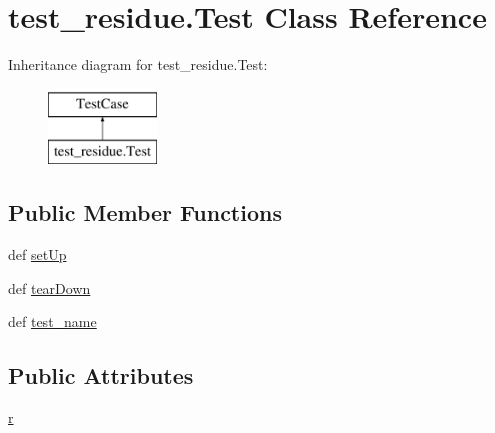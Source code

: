 \hypertarget{classtest__residue_1_1_test}{\section{test\-\_\-residue.\-Test Class Reference}
\label{classtest__residue_1_1_test}
}
Inheritance diagram for test\-\_\-residue.\-Test\-:\begin{figure}[H]
\begin{center}
\leavevmode
\includegraphics[height=2.000000cm]{classtest__residue_1_1_test}
\end{center}
\end{figure}
\subsection*{Public Member Functions}
\begin{DoxyCompactItemize}
\item 
def \hyperlink{classtest__residue_1_1_test_a3de9cc2e1207c57440fe254a327281cb}{set\-Up}
\item 
def \hyperlink{classtest__residue_1_1_test_aba3d56bc2acc6cb69c43946674b14807}{tear\-Down}
\item 
def \hyperlink{classtest__residue_1_1_test_a1f1b4ac54488dab8d9449a7ea70891e0}{test\-\_\-name}
\end{DoxyCompactItemize}
\subsection*{Public Attributes}
\begin{DoxyCompactItemize}
\item 
\hyperlink{classtest__residue_1_1_test_a86d05f73c4c2a2aa36049ed550f22877}{r}
\end{DoxyCompactItemize}


